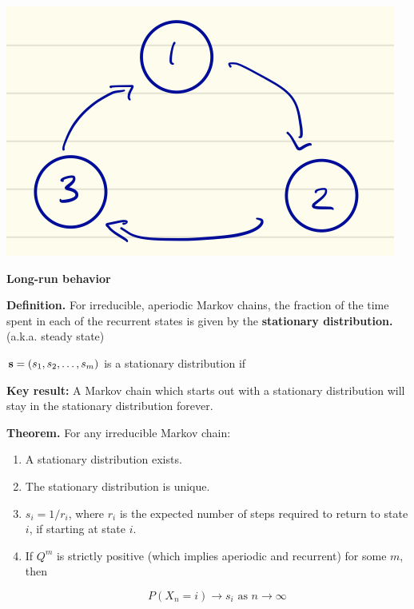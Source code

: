 \documentclass[11pt]{article}\usepackage[]{graphicx}\usepackage[]{color}
\newenvironment{knitrout}{}{} %
\begin{document}
\begin{multicols}{2}
\begin{knitrout}
{\centering \includegraphics[width=0.6\linewidth]{figs/mc4} 

}


\end{knitrout}

\vspace{1.15in}

\end{multicols}

\clearpage


{\bf Long-run behavior}

{\bf Definition.} For irreducible, aperiodic Markov chains, the fraction of the time spent in each of the recurrent states is given by the {\bf stationary distribution.} (a.k.a. steady state)

\bigskip

${\bf s} = (s_1, s_2, \ldots, s_m)$ is a stationary distribution if

\bigskip
\bigskip

{\bf Key result:}  A Markov chain which starts out with a stationary distribution will stay in the stationary distribution forever.

\bigskip
\bigskip

{\bf Theorem.} For any irreducible Markov chain:

\begin{enumerate}
\item A stationary distribution exists.

\item The stationary distribution is unique.

\item $s_i = 1/ r_i$, where $r_i$ is the expected number of steps required to return to state $i$, if starting at state $i$.

\item If $Q^m$ is strictly positive (which implies aperiodic and recurrent) for some $m$, then

$$P(X_n = i) \to s_i \text{ as } n \to \infty$$


\end{enumerate}
\end{document}
